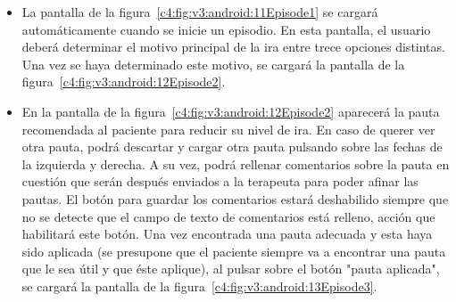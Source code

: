 \begin{itemize}
   \item La pantalla de la figura~\ref{c4:fig:v3:android:11Episode1} se cargará automáticamente cuando se inicie un episodio. En esta pantalla, el usuario deberá determinar el motivo principal de la ira entre trece opciones distintas. Una vez se haya determinado este motivo, se cargará la pantalla de la figura~\ref{c4:fig:v3:android:12Episode2}.
   \item En la pantalla de la figura~\ref{c4:fig:v3:android:12Episode2} aparecerá la pauta recomendada al paciente para reducir su nivel de ira. En caso de querer ver otra pauta, podrá descartar y cargar otra pauta pulsando sobre las fechas de la izquierda y derecha. A su vez, podrá rellenar comentarios sobre la pauta en cuestión que serán después enviados a la terapeuta para poder afinar las pautas. El botón para guardar los comentarios estará deshabilido siempre que no se detecte que el campo de texto de comentarios está relleno, acción que habilitará este botón. Una vez encontrada una pauta adecuada y esta haya sido aplicada (se presupone que el paciente siempre va a encontrar una pauta que le sea útil y que éste aplique), al pulsar sobre el botón "pauta aplicada", se cargará la pantalla de la figura~\ref{c4:fig:v3:android:13Episode3}.
   

\end{itemize}

